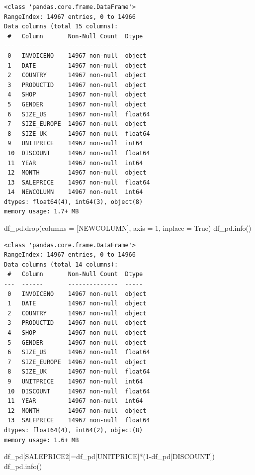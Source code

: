 \documentclass[
  letterpaper,
  DIV=11,
  numbers=noendperiod]{scrreprt}
\newenvironment{Shaded}{\begin{snugshade}}{\end{snugshade}}
\newcommand{\DecValTok}[1]{\textcolor[rgb]{0.68,0.00,0.00}{#1}}
\newcommand{\NormalTok}[1]{\textcolor[rgb]{0.00,0.23,0.31}{#1}}
\newcommand{\OperatorTok}[1]{\textcolor[rgb]{0.37,0.37,0.37}{#1}}
\newcommand{\StringTok}[1]{\textcolor[rgb]{0.13,0.47,0.30}{#1}}
\newcommand{\VariableTok}[1]{\textcolor[rgb]{0.07,0.07,0.07}{#1}}
\begin{document}
\begin{verbatim}
<class 'pandas.core.frame.DataFrame'>
RangeIndex: 14967 entries, 0 to 14966
Data columns (total 15 columns):
 #   Column       Non-Null Count  Dtype  
---  ------       --------------  -----  
 0   INVOICENO    14967 non-null  object 
 1   DATE         14967 non-null  object 
 2   COUNTRY      14967 non-null  object 
 3   PRODUCTID    14967 non-null  object 
 4   SHOP         14967 non-null  object 
 5   GENDER       14967 non-null  object 
 6   SIZE_US      14967 non-null  float64
 7   SIZE_EUROPE  14967 non-null  object 
 8   SIZE_UK      14967 non-null  float64
 9   UNITPRICE    14967 non-null  int64  
 10  DISCOUNT     14967 non-null  float64
 11  YEAR         14967 non-null  int64  
 12  MONTH        14967 non-null  object 
 13  SALEPRICE    14967 non-null  float64
 14  NEWCOLUMN    14967 non-null  int64  
dtypes: float64(4), int64(3), object(8)
memory usage: 1.7+ MB
\end{verbatim}

\begin{Shaded}
\begin{Highlighting}[]
\NormalTok{df\_pd.drop(columns }\OperatorTok{=}\NormalTok{ [}\StringTok{\textquotesingle{}NEWCOLUMN\textquotesingle{}}\NormalTok{], axis }\OperatorTok{=} \DecValTok{1}\NormalTok{, inplace }\OperatorTok{=} \VariableTok{True}\NormalTok{)   }
\NormalTok{df\_pd.info() }
\end{Highlighting}
\end{Shaded}

\begin{verbatim}
<class 'pandas.core.frame.DataFrame'>
RangeIndex: 14967 entries, 0 to 14966
Data columns (total 14 columns):
 #   Column       Non-Null Count  Dtype  
---  ------       --------------  -----  
 0   INVOICENO    14967 non-null  object 
 1   DATE         14967 non-null  object 
 2   COUNTRY      14967 non-null  object 
 3   PRODUCTID    14967 non-null  object 
 4   SHOP         14967 non-null  object 
 5   GENDER       14967 non-null  object 
 6   SIZE_US      14967 non-null  float64
 7   SIZE_EUROPE  14967 non-null  object 
 8   SIZE_UK      14967 non-null  float64
 9   UNITPRICE    14967 non-null  int64  
 10  DISCOUNT     14967 non-null  float64
 11  YEAR         14967 non-null  int64  
 12  MONTH        14967 non-null  object 
 13  SALEPRICE    14967 non-null  float64
dtypes: float64(4), int64(2), object(8)
memory usage: 1.6+ MB
\end{verbatim}

\begin{Shaded}
\begin{Highlighting}[]
\NormalTok{df\_pd[}\StringTok{\textquotesingle{}SALEPRICE2\textquotesingle{}}\NormalTok{]}\OperatorTok{=}\NormalTok{df\_pd[}\StringTok{\textquotesingle{}UNITPRICE\textquotesingle{}}\NormalTok{]}\OperatorTok{*}\NormalTok{(}\DecValTok{1}\OperatorTok{{-}}\NormalTok{df\_pd[}\StringTok{\textquotesingle{}DISCOUNT\textquotesingle{}}\NormalTok{])}
\NormalTok{df\_pd.info()}
\end{Highlighting}
\end{Shaded}
\end{document}

